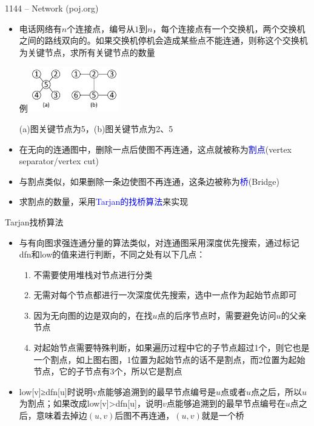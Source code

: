 \begin{frame}{1144 -- Network (poj.org)}
    \begin{itemize}
        \item 电话网络有$n$个连接点，编号从$1$到$n$，每个连接点有一个交换机，两个交换机之间的路线双向的。如果交换机停机会造成某些点不能连通，则称这个交换机为关键节点，求所有关键节点的数量
        \begin{exampleblock}{例}
            \includegraphics[width=0.3\textwidth,center]{fig/8-7.png}
            \centerline{\scriptsize{(a)图关键节点为5，(b)图关键节点为2、5}}
        \end{exampleblock}
        \item 在无向的连通图中，删除一点后使图不再连通，这点就被称为\textcolor{blue}{割点}(vertex separator/vertex cut)
        \item 与割点类似，如果删除一条边使图不再连通，这条边被称为\textcolor{blue}{桥}(Bridge)
        \item 求割点的数量，采用\textcolor{blue}{Tarjan的找桥算法}来实现
    \end{itemize}
\end{frame}
\begin{frame}{Tarjan找桥算法}
    \begin{itemize}
        \item 与有向图求强连通分量的算法类似，对连通图采用深度优先搜索，通过标记dfn和low的值来进行判断，不同之处有以下几点：
        \begin{enumerate}[(1)]
            \item 不需要使用堆栈对节点进行分类
            \item 无需对每个节点都进行一次深度优先搜索，选中一点作为起始节点即可
            \item 因为无向图的边是双向的，在找$u$点的后序节点时，需要避免访问$u$的父亲节点
            \item 对起始节点需要特殊判断，如果遍历过程中它的子节点超过1个，则它也是一个割点，如上图右图，1位置为起始节点的话不是割点，而2位置为起始节点，它的子节点有3个，所以它是割点
        \end{enumerate}
        \item low[v]≥dfn[u]时说明v点能够追溯到的最早节点编号是$u$点或者$u$点之后，所以$u$为割点；如果改成low[v]>dfn[u]，说明$v$点能够追溯到的最早节点编号在$u$点之后，意味着去掉边$(u,v)$后图不再连通，$(u,v)$就是一个桥
    \end{itemize}
\end{frame}
